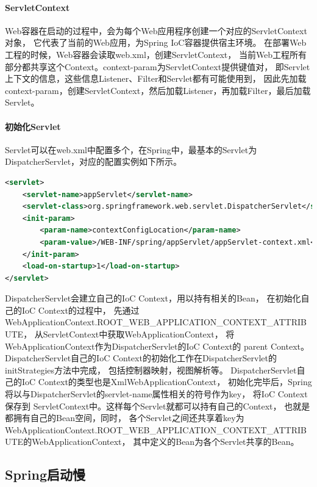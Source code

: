 \documentclass{book}
\begin{document}
\paragraph{ServletContext}
Web容器在启动的过程中，会为每个Web应用程序创建一个对应的ServletContext对象，
它代表了当前的Web应用，为Spring IoC容器提供宿主环境。
在部署Web工程的时候，Web容器会读取web.xml，创建ServletContext，
当前Web工程所有部分都共享这个Context。context-param为ServletContext提供键值对，
即Servlet上下文的信息，这些信息Listener、Filter和Servlet都有可能使用到，
因此先加载context-param，创建ServletContext，然后加载Listener，再加载Filter，最后加载Servlet。

\paragraph{初始化Servlet}

Servlet可以在web.xml中配置多个，在Spring中，最基本的Servlet为DispatcherServlet，对应的配置实例如下所示。

\begin{lstlisting}[language=XML]
<servlet>
	<servlet-name>appServlet</servlet-name>
	<servlet-class>org.springframework.web.servlet.DispatcherServlet</servlet-class>
	<init-param>
		<param-name>contextConfigLocation</param-name>
		<param-value>/WEB-INF/spring/appServlet/appServlet-context.xml</param-value>
	</init-param>
	<load-on-startup>1</load-on-startup>
</servlet>
\end{lstlisting}

DispatcherServlet会建立自己的IoC Context，用以持有相关的Bean，
在初始化自己的IoC Context的过程中，
先通过WebApplicationContext.ROOT\_WEB\_APPLICATION\_CONTEXT\_ATTRIBUTE，
从ServletContext中获取WebApplicationContext，
将WebApplicationContext作为DispatcherServlet的IoC Context的 parent Context。
DispatcherServlet自己的IoC Context的初始化工作在DispatcherServlet的initStrategies方法中完成，
包括控制器映射，视图解析等。
DispatcherServlet自己的IoC Context的类型也是XmlWebApplicationContext，
初始化完毕后，Spring将以与DispatcherServlet的servlet-name属性相关的符号作为key，
将IoC Context保存到 ServletContext中。这样每个Servlet就都可以持有自己的Context，
也就是都拥有自己的Bean空间，同时，
各个Servlet之间还共享着key为
WebApplicationContext.ROOT\_WEB\_APPLICATION\_CONTEXT\_ATTRIBUTE的WebApplicationContext，
其中定义的Bean为各个Servlet共享的Bean。

\subsection{Spring启动慢}
\end{document}
